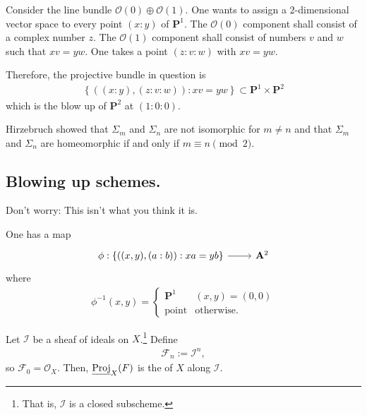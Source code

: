 \documentclass [11 pt, oneside] {article}
\begin{document}
\begin{example}[ ]
Consider the line bundle $\mathscr{O}(0)\oplus  \mathscr{O}(1)$. One wants to assign a $2$-dimensional vector space to every point $(x:y)$ of $\mathbf{P}^1$. The $\mathscr{O}(0)$ component shall consist of a complex number $z$. The $\mathscr{O}(1)$ component shall consist of numbers $v$ and $w$ such that $xv = yw$. One takes a point $(z:v:w)$ with $xv = yw$.

Therefore, the projective bundle in question is
\begin{align*}
	\left\{ \left( (x:y),  (z:v:w) \right) : xv=yw  \right\}\subset \mathbf{P}^1\times \mathbf{P}^2 
\end{align*}
which is the blow up of $\mathbf{P}^2$ at $(1:0:0)$.

Hirzebruch showed that $\Sigma_m$ and $\Sigma_n$ are not isomorphic for $m\ne n$ and that $\Sigma_m$ and $\Sigma_n$ are homeomorphic if and only if $m\equiv n\pmod 2$.
\end{example}

\subsection{Blowing up schemes.}
Don't worry: This isn't what you think it is.

\begin{example}\label{backtothis_{08}2}\text{}
One has a map
\[
\begin{tikzcd}
	\phi:\left\{ ((x,y), (a:b)) : xa=yb \right\} \ar[r]&\mathbf{A}^2
\end{tikzcd}
\]
where
\begin{align*}
	\phi^{-1}(x,y) = 
	 \begin{cases}
		 \mathbf{P}^1 & (x,y) =(0,0)\\
		 \textrm{point} &\textrm{otherwise.}
	\end{cases}
\end{align*}
\end{example}

Let $\mathscr{I}$ be a sheaf of ideals on $X$.\footnote{That is, $\mathscr{I}$ is a closed subscheme.} Define
\begin{align*}
	\mathscr{F}_n := \mathscr{I}^n,
\end{align*}
so $\mathscr{F}_0=\mathscr{O}_X$. Then, $\underline{\operatorname{Proj}}_X(\relax{F})$ is the  of $X$ along $\mathscr{I}$.
\end{document}
